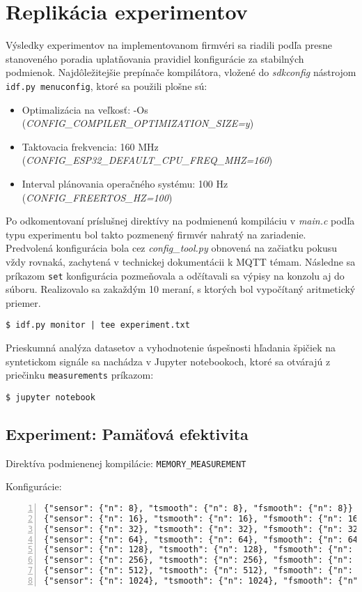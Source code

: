 \section{Replikácia experimentov}
Výsledky experimentov na implementovanom firmvéri sa riadili podľa presne stanoveného poradia
uplatňovania pravidiel konfigurácie za stabilných podmienok. Najdôležitejšie
prepínače kompilátora, vložené do \emph{sdkconfig} nástrojom \verb|idf.py menuconfig|, ktoré 
sa použili plošne sú:
\begin{itemize}[noitemsep,topsep=0pt]
    \item Optimalizácia na veľkosť: -Os \\(\emph{CONFIG\_COMPILER\_OPTIMIZATION\_SIZE=y})
   	\item Taktovacia frekvencia: 160 MHz  \\ (\emph{CONFIG\_ESP32\_DEFAULT\_CPU\_FREQ\_MHZ=160})
    \item Interval plánovania operačného systému: 100 Hz\\  (\emph{CONFIG\_FREERTOS\_HZ=100})
\end{itemize}
    
Po odkomentovaní príslušnej direktívy na podmienenú kompiláciu v \emph{main.c} podľa typu experimentu
bol takto pozmenený firmvér nahratý na zariadenie. Predvolená konfigurácia bola
cez \emph{config\_tool.py} obnovená na začiatku pokusu vždy rovnaká, zachytená v technickej dokumentácii
k MQTT témam. Následne sa príkazom \verb|set| konfigurácia pozmeňovala a odčítavali
sa výpisy na konzolu aj do súboru. Realizovalo sa zakaždým 10 meraní, s ktorých bol vypočítaný aritmetický priemer.
\begin{lstlisting}[style=messages]
$ idf.py monitor | tee experiment.txt
\end{lstlisting}
\bigbreak

Prieskumná analýza datasetov a vyhodnotenie úspešnosti hľadania špičiek na syntetickom signále
sa nachádza v Jupyter notebookoch, ktoré sa otvárajú z priečinku \verb|measurements| príkazom:
\begin{lstlisting}[style=messages]
$ jupyter notebook
\end{lstlisting}


\subsection*{Experiment: Pamäťová efektivita}
Direktíva podmienenej kompilácie: \verb|MEMORY_MEASUREMENT|

Konfigurácie:
\begin{lstlisting}[style=messages, numbers=left, numberstyle=\tiny]
{"sensor": {"n": 8}, "tsmooth": {"n": 8}, "fsmooth": {"n": 8}}
{"sensor": {"n": 16}, "tsmooth": {"n": 16}, "fsmooth": {"n": 16}}
{"sensor": {"n": 32}, "tsmooth": {"n": 32}, "fsmooth": {"n": 32}}
{"sensor": {"n": 64}, "tsmooth": {"n": 64}, "fsmooth": {"n": 64}}
{"sensor": {"n": 128}, "tsmooth": {"n": 128}, "fsmooth": {"n": 128}}
{"sensor": {"n": 256}, "tsmooth": {"n": 256}, "fsmooth": {"n": 256}}
{"sensor": {"n": 512}, "tsmooth": {"n": 512}, "fsmooth": {"n": 512}}
{"sensor": {"n": 1024}, "tsmooth": {"n": 1024}, "fsmooth": {"n": 1024}}
\end{lstlisting}

